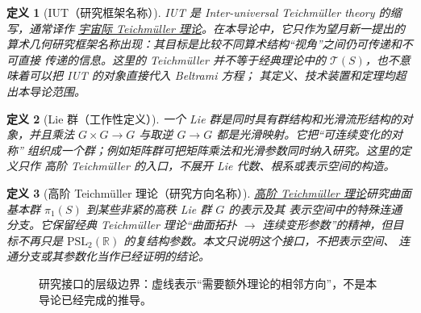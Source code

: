 \documentclass[UTF8,fontset=none,a4paper,11pt]{ctexart}
\theoremstyle{foundation-definition}
\newtheorem{definition}{定义}[section]
\theoremstyle{foundation-theorem}
\theoremstyle{foundation-proposition}
\theoremstyle{foundation-example}
\theoremstyle{foundation-remark}
\theoremstyle{foundation-theorem}
\newcommand{\T}{\mathcal T}
\newcommand{\M}{\mathcal M}
\newcommand{\term}[2]{\hyperref[#1]{#2}}
\begin{document}
\begin{definition}[IUT（研究框架名称）]\label{def:iut-program}
IUT 是 \emph{Inter-universal Teichmüller theory} 的缩写，通常译作
\term{def:iut-program}{宇宙际 Teichmüller 理论}。在本导论中，它只作为望月新一提出的
算术几何研究框架名称出现：其目标是比较不同算术结构“视角”之间仍可传递和不可直接
传递的信息。这里的 Teichmüller 并不等于经典理论中的
\(\term{def:teich}{\T(S)}\)，也不意味着可以把 IUT 的对象直接代入 Beltrami 方程；
其定义、技术装置和定理均超出本导论范围。
\end{definition}

\begin{definition}[Lie 群（工作性定义）]\label{def:lie-group}
一个 Lie 群是同时具有群结构和光滑流形结构的对象，并且乘法
\(G\times G\to G\) 与取逆 \(G\to G\) 都是光滑映射。它把“可连续变化的对称”
组织成一个群；例如矩阵群可把矩阵乘法和光滑参数同时纳入研究。这里的定义只作
高阶 Teichmüller 的入口，不展开 Lie 代数、根系或表示空间的构造。
\end{definition}

\begin{definition}[高阶 Teichmüller 理论（研究方向名称）]\label{def:higher-teichmuller}
\term{def:higher-teichmuller}{高阶 Teichmüller 理论}研究曲面基本群
\(\term{def:fundamental-group}{\pi_1(S)}\) 到某些非紧的高秩 Lie 群 \(G\) 的表示及其
表示空间中的特殊连通分支。它保留经典 Teichmüller 理论“曲面拓扑
\(\longrightarrow\) 连续变形参数”的精神，但目标不再只是
\(\mathrm{PSL}_2(\mathbb R)\) 的复结构参数。本文只说明这个接口，不把表示空间、
连通分支或其参数化当作已经证明的结论。
\end{definition}

\begin{figure}[htbp]
\centering
{}
\caption{研究接口的层级边界：虚线表示“需要额外理论的相邻方向”，不是本导论已经完成的推导。}
\label{fig:advanced-boundaries}
\end{figure}
\end{document}
